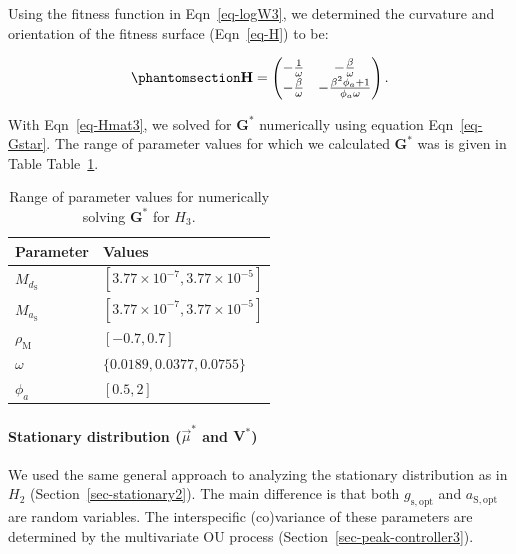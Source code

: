 \documentclass[
  letterpaper,
  DIV=11,
  numbers=noendperiod]{scrartcl}
\let\oldparagraph\paragraph
\renewcommand{\paragraph}[1]{\oldparagraph{#1}\mbox{}}
\begin{document}
Using the fitness function in Eqn~\ref{eq-logW3}, we determined the
curvature and orientation of the fitness surface (Eqn~\ref{eq-H}) to be:

\begin{equation}\phantomsection\label{eq-Hmat3}{\mathbf{H} = \begin{pmatrix} -\frac{1}{\omega} & -\frac{\beta}{\omega} \\ -\frac{\beta}{\omega} & - \frac{\beta ^2 \phi_a + 1}{\phi_a \omega} \end{pmatrix}.}\end{equation}

With Eqn~\ref{eq-Hmat3}, we solved for \(\mathbf{G}^*\) numerically
using equation Eqn~\ref{eq-Gstar}. The range of parameter values for
which we calculated \(\mathbf{G}^*\) was is given in Table
Table~\ref{tbl-G_h3_pars}.

\begin{longtable}[]{@{}ll@{}}

\caption{\label{tbl-G_h3_pars}Range of parameter values for numerically
solving \(\mathbf{G}^*\) for \(H_3\).}

\tabularnewline

\toprule\noalign{}
Parameter & Values \\
\midrule\noalign{}
\endhead
\bottomrule\noalign{}
\endlastfoot
\(M_{d_\mathrm{S}}\) &
\([3.77 \times 10 ^ {-7}, 3.77 \times 10 ^ {-5}]\) \\
\(M_{a_\mathrm{S}}\) &
\([3.77 \times 10 ^ {-7}, 3.77 \times 10 ^ {-5}]\) \\
\(\rho_\mathrm{M}\) & \([-0.7, 0.7]\) \\
\(\omega\) & \(\{0.0189, 0.0377, 0.0755\}\) \\
\(\phi_a\) & \([0.5, 2]\) \\

\end{longtable}

\paragraph{\texorpdfstring{Stationary distribution (\(\vec{\mu}^*\) and
\(\mathbf{V}^*\))}{Stationary distribution (\textbackslash vec\{\textbackslash mu\}\^{}* and \textbackslash mathbf\{V\}\^{}*)}}\label{sec-stationary3}

We used the same general approach to analyzing the stationary
distribution as in \(H_2\) (Section~\ref{sec-stationary2}). The main
difference is that both \(g_\mathrm{s,opt}\) and \(a_\mathrm{S,opt}\)
are random variables. The interspecific (co)variance of these parameters
are determined by the multivariate OU process
(Section~\ref{sec-peak-controller3}).
\end{document}
